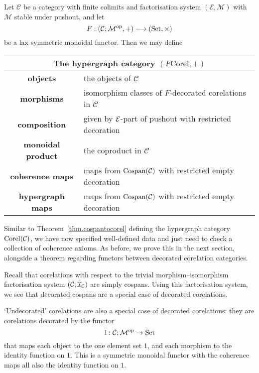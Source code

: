 \begin{theorem} \label{thm.fcorel}
  Let $\mathcal C$ be a category with finite colimits and factorisation system
  $(\mathcal E, \mathcal M)$ with $\mathcal M$ stable under pushout, and let 
  \[
    F: (\mathcal C;\mathcal M^{\mathrm{op}},+) \longrightarrow (\mathrm{Set}, \times)
  \]
  be a lax symmetric monoidal functor.  Then we may define 
  \smallskip 

  \begin{center}
    \begin{tabular}{| c | p{} |}
      \hline
      \multicolumn{2}{|c|}{The hypergraph category $(F\mathrm{Corel},+)$} \\
      \hline
      \textbf{objects} & the objects of $\mathcal C$ \\ 
      \textbf{morphisms} & isomorphism classes of $F$-decorated corelations in
      $\mathcal C$\\ 
      \textbf{composition} & given by $\mathcal E$-part of pushout with restricted
      decoration  \\
      \textbf{monoidal product} & the coproduct in $\mathcal C$  \\
      \textbf{coherence maps} & maps from $\operatorname{{Cospan}}(\mathcal C)$ with restricted empty
      decoration \\
      \textbf{hypergraph maps} & maps from $\operatorname{{Cospan}}(\mathcal C)$ with restricted empty
      decoration \\
      \hline
    \end{tabular}
  \end{center}
  \smallskip 
\end{theorem}

Similar to Theorem~\ref{thm.cospantocorel} defining the hypergraph category
$\operatorname{{Corel}}(\mathcal C)$, we have now specified well-defined data and just need to check a
collection of coherence axioms. As before, we prove this in the next section,
alongside a theorem regarding functors between decorated corelation categories.

\begin{examples} \label{ex.cospansascorels}
  Recall that corelations with respect to the trivial \linebreak
  morphism--isomorphism factorisation system $(\mathcal C, \mathcal I_{\mathcal C})$ are simply
  cospans. Using this factorisation system, we see that decorated cospans are a
  special case of decorated corelations.
\end{examples}

\begin{example} \label{ex.undeccorel}
  `Undecorated' corelations are also a special case of decorated
  corelations: they are corelations decorated by the functor 
  \[
    1{\colon} \mathcal C;\mathcal M^{\mathrm{op}} \to \mathrm{Set}
  \] 
  that maps each object to the one element set $1$, and each morphism to the
  identity function on $1$. This is a symmetric monoidal functor with the
  coherence maps all also the identity function on $1$.
\end{example}


